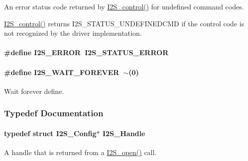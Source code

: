 An error status code returned by \hyperlink{_i2_s_8h_a1af19b22e9036bee696b4e4efe4916b0}{I2\+S\+\_\+control()} for undefined command codes. 

\hyperlink{_i2_s_8h_a1af19b22e9036bee696b4e4efe4916b0}{I2\+S\+\_\+control()} returns I2\+S\+\_\+\+S\+T\+A\+T\+U\+S\+\_\+\+U\+N\+D\+E\+F\+I\+N\+E\+D\+C\+M\+D if the control code is not recognized by the driver implementation. 
\paragraph[{I2\+S\+\_\+\+E\+R\+R\+O\+R}]{\setlength{\rightskip}{0pt plus 5cm}\#define I2\+S\+\_\+\+E\+R\+R\+O\+R~{\bf I2\+S\+\_\+\+S\+T\+A\+T\+U\+S\+\_\+\+E\+R\+R\+O\+R}}\label{_i2_s_8h_a81d0dd9da59128b28cb23c59fe57c939}
\paragraph[{I2\+S\+\_\+\+W\+A\+I\+T\+\_\+\+F\+O\+R\+E\+V\+E\+R}]{\setlength{\rightskip}{0pt plus 5cm}\#define I2\+S\+\_\+\+W\+A\+I\+T\+\_\+\+F\+O\+R\+E\+V\+E\+R~$\sim$(0)}\label{_i2_s_8h_a8fd310c110b6a9425cf61753f3e956ab}


Wait forever define. 



\subsubsection{Typedef Documentation}
\paragraph[{I2\+S\+\_\+\+Handle}]{\setlength{\rightskip}{0pt plus 5cm}typedef struct {\bf I2\+S\+\_\+\+Config}$\ast$ {\bf I2\+S\+\_\+\+Handle}}\label{_i2_s_8h_aff0fad1efd0d9dc3c8d2cc87e73cd5a0}


A handle that is returned from a \hyperlink{_i2_s_8h_aad4ce7cbdf38dc5597f5a92ad056ebc1}{I2\+S\+\_\+open()} call. 

